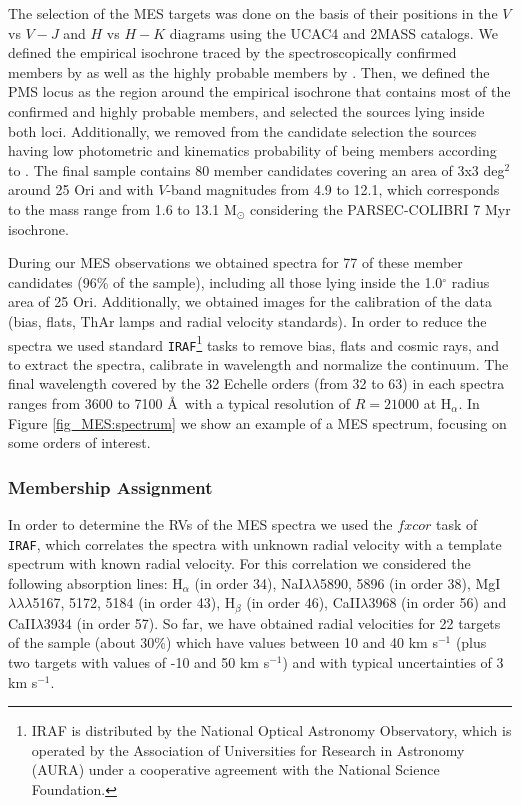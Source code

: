 \documentclass[12pt]{article}
\newcounter{subsubsubsection}[subsubsection]
\begin{document}
\label{sec_echelle:targets}
The selection of the MES targets was done on the basis of their positions in the $V$ vs $V-J$ and $H$ vs $H-K$ diagrams using the UCAC4 and 2MASS catalogs. We defined the empirical isochrone traced by the spectroscopically confirmed members by \citet{Briceno2005,Briceno2007,Downes2014} as well as the highly probable members by \citet{Kharchenko2005}. Then, we defined the PMS locus as the region around the empirical isochrone that contains most of the confirmed and highly probable members, and selected the sources lying inside both loci. Additionally, we removed from the candidate selection the sources having low photometric and kinematics probability of being members according to \citet{Kharchenko2005}. The final sample contains 80 member candidates covering an area of 3x3 deg$^2$ around 25 Ori and with $V$-band magnitudes from 4.9 to 12.1, which corresponds to the mass range from 1.6 to 13.1 M$_\odot$ considering the PARSEC-COLIBRI 7 Myr isochrone.

\label{sec_echelle:reduction}
During our MES observations we obtained spectra for 77 of these member candidates (96\% of the sample), including all those lying inside the 1.0$^\circ$ radius area of 25 Ori. Additionally, we obtained images for the calibration of the data (bias, flats, ThAr lamps and radial velocity standards). In order to reduce the spectra we used standard \texttt{IRAF}\footnote{IRAF is distributed by the National Optical Astronomy Observatory, which is operated by the Association of Universities for Research in Astronomy (AURA) under a cooperative agreement with the National Science Foundation.} tasks to remove bias, flats and cosmic rays, and to extract the spectra, calibrate in wavelength and normalize the continuum. The final wavelength covered by the 32 Echelle orders (from 32 to 63) in each spectra ranges from 3600 to 7100 \AA\ with a typical resolution of $R=21000$ at H$_\alpha$. In Figure \ref{fig_MES:spectrum} we show an example of a MES spectrum, focusing on some orders of interest.

\subsubsection{Membership Assignment}
\label{sec_MES:membership}
In order to determine the RVs of the MES spectra we used the $fxcor$ task of \texttt{IRAF}, which correlates the spectra with unknown radial velocity with a template spectrum with known radial velocity. For this correlation we considered the following absorption lines: H$_\alpha$ (in order 34), NaI$\lambda\lambda$5890, 5896 (in order 38), MgI$\lambda\lambda\lambda$5167, 5172, 5184 (in order 43), H$_\beta$ (in order 46), CaII$\lambda$3968 (in order 56) and CaII$\lambda$3934 (in order 57). So far, we have obtained radial velocities for 22 targets of the sample (about 30\%) which have values between 10 and 40 km s$^{-1}$ (plus two targets with values of -10 and 50 km s$^{-1}$) and with typical uncertainties of 3 km s$^{-1}$. 
\end{document}

